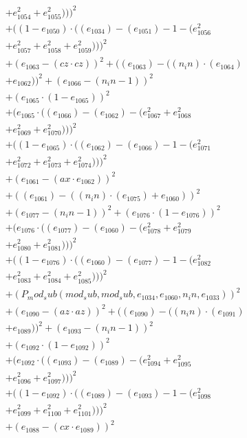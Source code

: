 \documentclass[10pt, a4paper]{article}
\begin{document}
\begin{align*}
& + e_{1054}^{2} + e_{1055}^{2})))^{2} \\
& + ((1 - e_{1050})  \cdot  ((e_{1034}) - (e_{1051}) - 1 - (e_{1056}^{2} \\
& + e_{1057}^{2} + e_{1058}^{2} + e_{1059}^{2})))^{2} \\
& + (e_{1063} - (cz  \cdot  cz))^{2} + ((e_{1063}) - ((n_in)  \cdot  (e_{1064}) \\
& + e_{1062}))^{2} + (e_{1066} - (n_in - 1))^{2} \\
& + (e_{1065}  \cdot  (1 - e_{1065}))^{2} \\
& + (e_{1065}  \cdot  ((e_{1066}) - (e_{1062}) - (e_{1067}^{2} + e_{1068}^{2} \\
& + e_{1069}^{2} + e_{1070}^{2})))^{2} \\
& + ((1 - e_{1065})  \cdot  ((e_{1062}) - (e_{1066}) - 1 - (e_{1071}^{2} \\
& + e_{1072}^{2} + e_{1073}^{2} + e_{1074}^{2})))^{2} \\
& + (e_{1061} - (ax  \cdot  e_{1062}))^{2} \\
& + ((e_{1061}) - ((n_in)  \cdot  (e_{1075}) + e_{1060}))^{2} \\
& + (e_{1077} - (n_in - 1))^{2} + (e_{1076}  \cdot  (1 - e_{1076}))^{2} \\
& + (e_{1076}  \cdot  ((e_{1077}) - (e_{1060}) - (e_{1078}^{2} + e_{1079}^{2} \\
& + e_{1080}^{2} + e_{1081}^{2})))^{2} \\
& + ((1 - e_{1076})  \cdot  ((e_{1060}) - (e_{1077}) - 1 - (e_{1082}^{2} \\
& + e_{1083}^{2} + e_{1084}^{2} + e_{1085}^{2})))^{2} \\
& + (P_mod_sub(mod_sub, mod_sub, e_{1034}, e_{1060}, n_in, e_{1033}))^{2} \\
& + (e_{1090} - (az  \cdot  az))^{2} + ((e_{1090}) - ((n_in)  \cdot  (e_{1091}) \\
& + e_{1089}))^{2} + (e_{1093} - (n_in - 1))^{2} \\
& + (e_{1092}  \cdot  (1 - e_{1092}))^{2} \\
& + (e_{1092}  \cdot  ((e_{1093}) - (e_{1089}) - (e_{1094}^{2} + e_{1095}^{2} \\
& + e_{1096}^{2} + e_{1097}^{2})))^{2} \\
& + ((1 - e_{1092})  \cdot  ((e_{1089}) - (e_{1093}) - 1 - (e_{1098}^{2} \\
& + e_{1099}^{2} + e_{1100}^{2} + e_{1101}^{2})))^{2} \\
& + (e_{1088} - (cx  \cdot  e_{1089}))^{2} \\

\end{align*}
\end{document}
